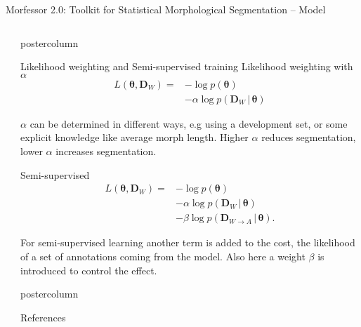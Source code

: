\documentclass[final]{beamer} %
\newcommand{\seq}[1]{\boldsymbol{#1}}
\newcommand{\cost}{L}
\newcommand{\params}{\boldsymbol{\theta}}
\newcommand{\data}{\seq{D}}
\newcommand{\vb}{\,|\,}
\begin{document}
\begin{frame}{Morfessor 2.0: Toolkit for Statistical Morphological Segmentation -- Model}
\begin{columns}
\begin{column}{.3\textwidth}
\end{column}
\begin{column}{.3\textwidth}




      \begin{beamercolorbox}[center,wd=\textwidth]{postercolumn}
 \begin{block}{Likelihood weighting and Semi-supervised training }
Likelihood weighting with $\alpha$ \citep{kohonen2010semisupervised,virpioja2011nodalida}
\begin{align*}
  \cost(\params, \data_W) =& - \log p(\params) \\&- \alpha \log p(\data_W
  \vb \params)
\end{align*}

$\alpha$ can be determined in different ways, e.g using a development set, or some explicit knowledge like average morph length. Higher $\alpha$ reduces segmentation, lower $\alpha$ increases segmentation.

Semi-supervised \citep{kohonen2010semisupervised}
\begin{align*}
  \cost(\params, \data_W) = & - \log p(\params) \\&- \alpha \log p(\data_W
  \vb \params) \\&- \beta \log p(\data_{W \to A} \vb \params).
\end{align*}

For semi-supervised learning another term is added to the cost, the likelihood of a set of annotations coming from the model. Also here a weight $\beta$ is introduced to control the effect.

            \end{block}
	\end{beamercolorbox}


  \begin{beamercolorbox}[center,wd=\textwidth]{postercolumn}
 \begin{block}{References}
\footnotesize

           
            \end{block}
            
	\end{beamercolorbox}




\end{column}

\end{columns}
 \end{frame}



  
\end{document}
